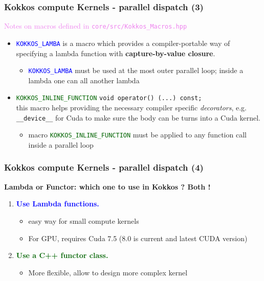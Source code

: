 \begin{frame}[fragile=singleslide]
  \frametitle{Kokkos compute Kernels - parallel dispatch (3)}

  {\Large \textcolor{violet}{Notes on macros defined in \texttt{core/src/Kokkos\_Macros.hpp}}}

  \begin{itemize}
  \item \textcolor{blue}{\texttt{KOKKOS\_LAMBA}} is a macro which provides a compiler-portable way of specifying a lambda function with \textbf{capture-by-value closure}.
    \begin{itemize}
    \item \textcolor{blue}{\texttt{KOKKOS\_LAMBA}} must be used at the most outer parallel loop; inside a lambda one can all another lambda
    \end{itemize}
  \item \textcolor{darkgreen}{\texttt{KOKKOS\_INLINE\_FUNCTION}} \texttt{void operator() (...) const;}\\
    this macro helps providing the necessary compiler specific \textit{decorators}, e.g. \texttt{\_\_device\_\_} for Cuda to make sure the body can be turns into a Cuda kernel.
    \begin{itemize}
    \item macro \textcolor{darkgreen}{\texttt{KOKKOS\_INLINE\_FUNCTION}} must be applied to any function call inside a parallel loop
    \end{itemize}
  \end{itemize}

\end{frame}

\begin{frame}[fragile=singleslide]
  \frametitle{Kokkos compute Kernels - parallel dispatch (4)}


  \textbf{Lambda or Functor: which one to use in Kokkos ? Both !}
  \begin{enumerate}
  \item \textcolor{blue}{\textbf{Use Lambda functions.}}\\
    \begin{itemize}
    \item easy way for small compute kernels
    \item For GPU, requires Cuda 7.5 (8.0 is current and latest CUDA version)
    \end{itemize}
  \item \textcolor{darkgreen}{\textbf{Use a C++ functor class.}}\\
    \begin{itemize}
    \item More flexible, allow to design more complex kernel
    \end{itemize}
  \end{enumerate}
\end{frame}

